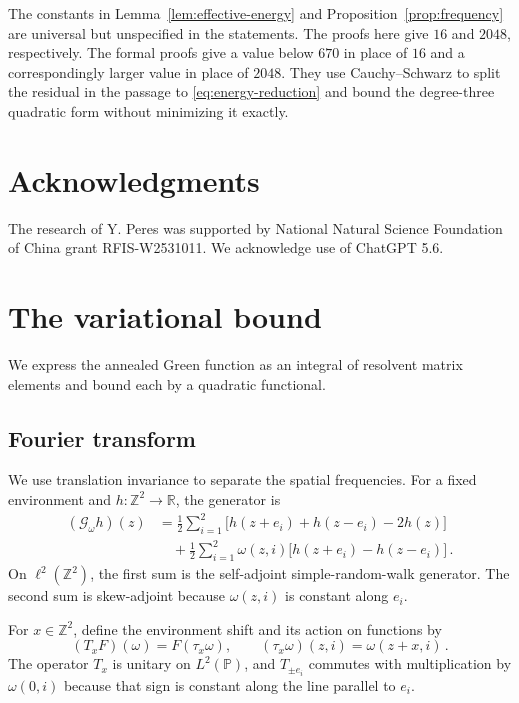 \documentclass[11pt]{amsart}
\theoremstyle{plain}
\theoremstyle{definition}
\newcommand{\Z}{\mathbb Z}
\newcommand{\R}{\mathbb R}
\renewcommand{\P}{\mathbb P}
\newcommand{\1}{\mathbf 1}
\begin{document}
The constants in Lemma~\ref{lem:effective-energy} and
Proposition~\ref{prop:frequency} are universal but unspecified in the
statements.  The proofs here give $16$ and $2048$, respectively.  The formal
proofs give a value below $670$ in place of $16$ and a correspondingly larger
value in place of $2048$.  They use Cauchy--Schwarz to split the residual in
the passage to \eqref{eq:energy-reduction} and bound the degree-three
quadratic form without minimizing it exactly.

\section*{Acknowledgments}
The research of Y. Peres was supported by National Natural Science Foundation of China grant
RFIS-W2531011.  We acknowledge use of ChatGPT 5.6.

\section{The variational bound}\label{sec:variational}

We express the annealed Green function as an integral of resolvent matrix
elements and bound each by a quadratic functional.

\subsection{Fourier transform}\label{ssec:fourier}

We use translation invariance to separate the spatial frequencies.
For a fixed environment and $h\colon\Z^2\to\R$, the generator is
\begin{equation}\label{eq:discrete-drift}
\begin{split}
  (\mathcal G_\omega h)(z)
  &=\frac12\sum_{i=1}^2
    \bigl[h(z+e_i)+h(z-e_i)-2h(z)\bigr]\\
  &\quad+\frac12\sum_{i=1}^2\omega(z,i)
    \bigl[h(z+e_i)-h(z-e_i)\bigr]\, .
\end{split}
\end{equation}
On $\ell^2(\Z^2)$, the first sum is the self-adjoint simple-random-walk
generator.  The second sum is skew-adjoint because $\omega(z,i)$ is
constant along $e_i$.

For $x\in\Z^2$, define the environment shift and its action on functions by
\[
  (T_xF)(\omega)=F(\tau_x\omega),\qquad
  (\tau_x\omega)(z,i)=\omega(z+x,i)\, .
\]
The operator $T_x$ is unitary on $L^2(\P)$, and $T_{\pm e_i}$ commutes
with multiplication by $\omega(0,i)$ because that sign is constant along
the line parallel to $e_i$.
\end{document}
